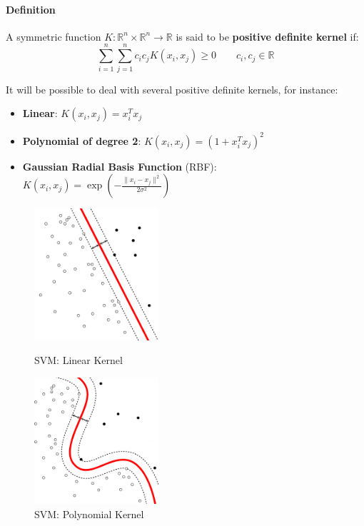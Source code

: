 \paragraph{Definition} 
A symmetric function  $K: \mathbb{R}^n\times\mathbb{R}^n \rightarrow \mathbb{R}$ is said to be \textbf{positive definite kernel} if:
$$\sum_{i=1}^n \sum_{j=1}^n c_i c_j K(x_i, x_j) \geq 0	\qquad c_i,c_j \in \mathbb{R}$$

It will be possible to deal with several positive definite kernels, for instance:
\begin{itemize}
	\item \textbf{Linear}: $K(x_i,x_j) = x_i^Tx_j$
	\item \textbf{Polynomial of degree 2}: $K(x_i,x_j) = (1 + x_i^Tx_j)^2$
	\item \textbf{Gaussian Radial Basis Function} (RBF): 
	$K(x_i, x_j) = \exp\left(-\frac{\|x_i - x_j\|^2}{2\sigma^2}\right)$
\end{itemize}
\begin{figure}[!h]
	\begin{minipage}[t]{0.5\linewidth}
		\centering
		\includegraphics[width=0.41\textwidth]{img/Linear_Kernel_Machine.png}
		\caption{SVM: Linear Kernel}
		\label{f1}
	\end{minipage}
	\hspace{0.1cm}
	\begin{minipage}[t]{0.5\linewidth} 
		\centering
		\includegraphics[width=0.41\textwidth]{img/Poly_Kernel_Machine.png}
		\caption{SVM: Polynomial Kernel}
		\label{f2}
	\end{minipage}        
\end{figure} 


